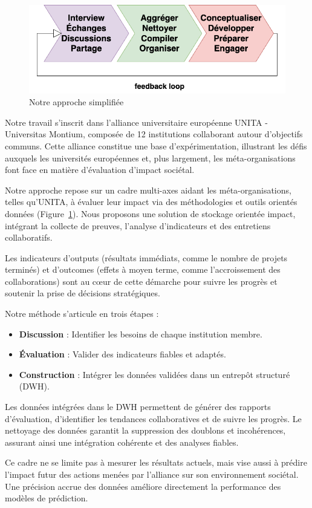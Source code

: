 \begin{figure}
    \centering
    \includegraphics[width=0.75\linewidth]{images/Diagrams-Simplified framework chain Our approach.png}
    \caption{Notre approche simplifiée}
    \label{fig:simplified-approach}
\end{figure}

Notre travail s’inscrit dans l’alliance universitaire européenne UNITA - Universitas Montium, composée de 12 institutions collaborant autour d’objectifs communs. Cette alliance constitue une base d’expérimentation, illustrant les défis auxquels les universités européennes et, plus largement, les méta-organisations font face en matière d’évaluation d’impact sociétal.

Notre approche repose sur un cadre multi-axes aidant les méta-organisations, telles qu’UNITA, à évaluer leur impact via des méthodologies et outils orientés données (Figure~\ref{fig:simplified-approach}). Nous proposons une solution de stockage orientée impact, intégrant la collecte de preuves, l’analyse d’indicateurs et des entretiens collaboratifs.

Les indicateurs d’outputs (résultats immédiats, comme le nombre de projets terminés) et d’outcomes (effets à moyen terme, comme l’accroissement des collaborations) sont au cœur de cette démarche pour suivre les progrès et soutenir la prise de décisions stratégiques.

Notre méthode s’articule en trois étapes : 
\begin{itemize} 
\item \textbf{Discussion} : Identifier les besoins de chaque institution membre. \item \textbf{Évaluation} : Valider des indicateurs fiables et adaptés. 
\item \textbf{Construction} : Intégrer les données validées dans un entrepôt structuré (DWH). 
\end{itemize}

Les données intégrées dans le DWH permettent de générer des rapports d’évaluation, d’identifier les tendances collaboratives et de suivre les progrès. Le nettoyage des données garantit la suppression des doublons et incohérences, assurant ainsi une intégration cohérente et des analyses fiables.

Ce cadre ne se limite pas à mesurer les résultats actuels, mais vise aussi à prédire l’impact futur des actions menées par l’alliance sur son environnement sociétal. Une précision accrue des données améliore directement la performance des modèles de prédiction.